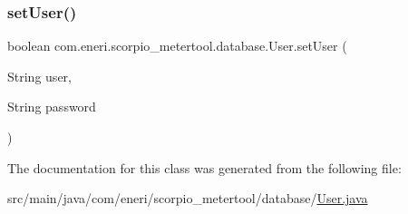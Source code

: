 \mbox{\label{classcom_1_1eneri_1_1scorpio__metertool_1_1database_1_1_user_a0c4c1bf6ede083f317ce55d26bd1cf14}} 
\subsubsection{\texorpdfstring{set\+User()}{setUser()}}
{\footnotesize\ttfamily boolean com.\+eneri.\+scorpio\+\_\+metertool.\+database.\+User.\+set\+User (\begin{DoxyParamCaption}\item[{String}]{user,  }\item[{String}]{password }\end{DoxyParamCaption})}



The documentation for this class was generated from the following file\+:\begin{DoxyCompactItemize}
\item 
src/main/java/com/eneri/scorpio\+\_\+metertool/database/\hyperlink{_user_8java}{User.\+java}\end{DoxyCompactItemize}
